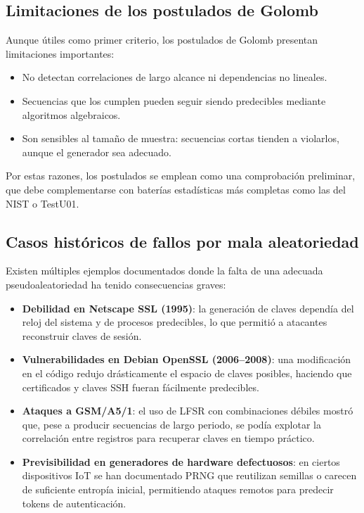 \subsection*{Limitaciones de los postulados de Golomb}
Aunque útiles como primer criterio, los postulados de Golomb presentan limitaciones importantes:
\begin{itemize}
  \item No detectan correlaciones de largo alcance ni dependencias no lineales.
  \item Secuencias que los cumplen pueden seguir siendo predecibles mediante algoritmos algebraicos.
  \item Son sensibles al tamaño de muestra: secuencias cortas tienden a violarlos, aunque el generador sea adecuado.
\end{itemize}
Por estas razones, los postulados se emplean como una comprobación preliminar, que debe complementarse con baterías estadísticas más completas como las del NIST o TestU01.

\subsection*{Casos históricos de fallos por mala aleatoriedad}

Existen múltiples ejemplos documentados donde la falta de una adecuada
pseudoaleatoriedad ha tenido consecuencias graves:

\begin{itemize}
    \item \textbf{Debilidad en Netscape SSL (1995)}: la generación de claves
    dependía del reloj del sistema y de procesos predecibles, lo que permitió a
    atacantes reconstruir claves de sesión.

    \item \textbf{Vulnerabilidades en Debian OpenSSL (2006–2008)}: una modificación
    en el código redujo drásticamente el espacio de claves posibles, haciendo que
    certificados y claves SSH fueran fácilmente predecibles.

    \item \textbf{Ataques a GSM/A5/1}: el uso de LFSR con combinaciones débiles
    mostró que, pese a producir secuencias de largo periodo, se podía explotar la
    correlación entre registros para recuperar claves en tiempo práctico.

    \item \textbf{Previsibilidad en generadores de hardware defectuosos}: en ciertos
    dispositivos IoT se han documentado PRNG que reutilizan semillas o carecen de
    suficiente entropía inicial, permitiendo ataques remotos para predecir tokens
    de autenticación.
\end{itemize}


